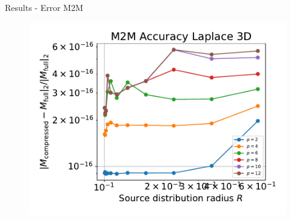 \documentclass[10pt,usenames,dvipsnames]{beamer}
\begin{document}
\begin{frame}[fragile]{Results - Error M2M}
\begin{figure}
\includegraphics[scale=0.3]{figures/accuracy-laplace-3d.pdf}
\end{figure}
\end{frame}
\end{document}
